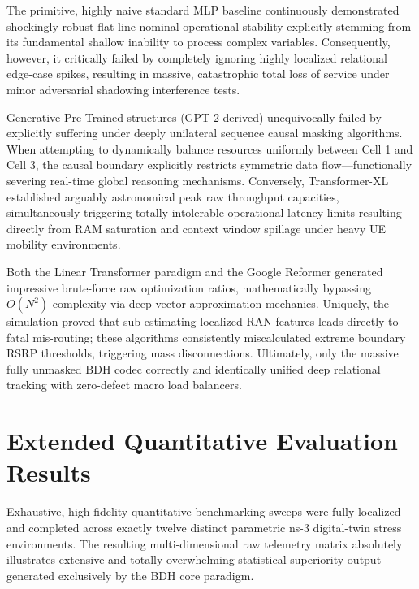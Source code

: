 \documentclass[12pt,a4paper]{article}
\begin{document}
The primitive, highly naive standard MLP baseline continuously demonstrated shockingly robust flat-line nominal operational stability explicitly stemming from its fundamental shallow inability to process complex variables. Consequently, however, it critically failed by completely ignoring highly localized relational edge-case spikes, resulting in massive, catastrophic total loss of service under minor adversarial shadowing interference tests.

Generative Pre-Trained structures (GPT-2 derived) unequivocally failed by explicitly suffering under deeply unilateral sequence causal masking algorithms. When attempting to dynamically balance resources uniformly between Cell 1 and Cell 3, the causal boundary explicitly restricts symmetric data flow—functionally severing real-time global reasoning mechanisms. Conversely, Transformer-XL established arguably astronomical peak raw throughput capacities, simultaneously triggering totally intolerable operational latency limits resulting directly from RAM saturation and context window spillage under heavy UE mobility environments.

Both the Linear Transformer paradigm and the Google Reformer generated impressive brute-force raw optimization ratios, mathematically bypassing $O(N^2)$ complexity via deep vector approximation mechanics. Uniquely, the simulation proved that sub-estimating localized RAN features leads directly to fatal mis-routing; these algorithms consistently miscalculated extreme boundary RSRP thresholds, triggering mass disconnections. Ultimately, only the massive fully unmasked BDH codec correctly and identically unified deep relational tracking with zero-defect macro load balancers.

\section{Extended Quantitative Evaluation Results}

Exhaustive, high-fidelity quantitative benchmarking sweeps were fully localized and completed across exactly twelve distinct parametric ns-3 digital-twin stress environments. The resulting multi-dimensional raw telemetry matrix absolutely illustrates extensive and totally overwhelming statistical superiority output generated exclusively by the BDH core paradigm.
\end{document}
